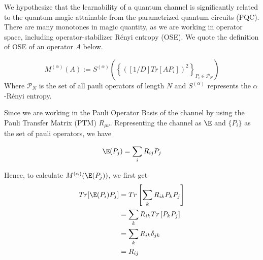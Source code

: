 We hypothesize that the learnability of a quantum channel is significantly related to the quantum magic attainable from the parametrized quantum circuits (PQC). There are many monotones in magic quantity, as we are working in operator space, including operator-stabilizer Rényi entropy (OSE). We quote the definition of OSE of an operator $A$ below.

\begin{equation}
    M^{(\alpha)}(A) := S^{(\alpha)}\left(\left\{ ([1/D]Tr[AP_i])^2\right\}_{P_i\in\mathcal{P}_N}\right)
\end{equation}
Where $\mathcal{P}_N$ is the set of all pauli operators of length $N$ and $S^{(\alpha)}$ represents the $\alpha$-Rényi entropy.

Since we are working in the Pauli Operator Basis of the channel by using the Pauli Transfer Matrix (PTM) $R_{\mu\nu}$. Representing the channel as $\E$ and $\{P_i\}$ as the set of pauli operators, we have

\begin{equation}
    \E(P_j) = \sum_iR_{ij}P_j
\end{equation}

Hence, to calculate $M^{(\alpha)}(\E(P_j))$, we first get
\begin{equation}
\begin{split}
    Tr[\E(P_i)P_j]&=Tr\left[\sum_kR_{ik}P_k P_j\right]\\
    &=\sum_kR_{ik}Tr\left[P_kP_j\right]\\
    &=\sum_kR_{ik}\delta_{jk}\\
    &=R_{ij}
\end{split}
\end{equation}

